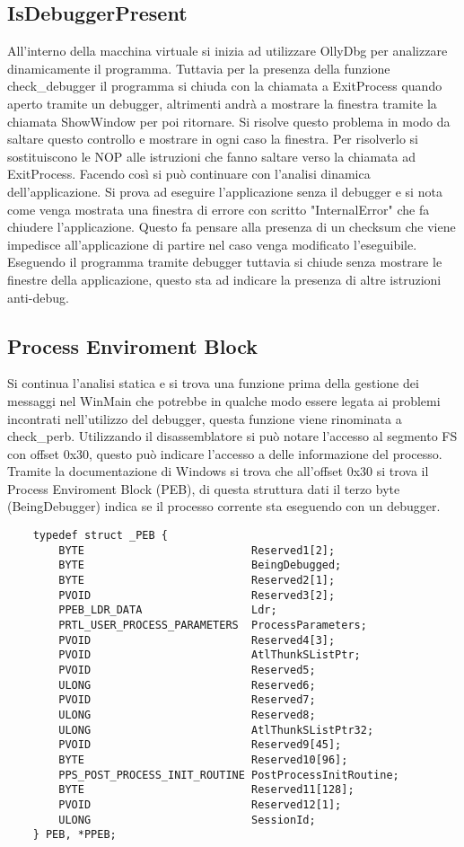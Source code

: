 \documentclass[a4paper,10pt]{article}
\begin{document}
\subsection{IsDebuggerPresent}
All'interno della macchina virtuale si inizia ad utilizzare OllyDbg per analizzare dinamicamente il programma. Tuttavia per la presenza della funzione check\_debugger il programma si chiuda con la chiamata a ExitProcess quando aperto tramite un debugger, altrimenti andrà a mostrare la finestra tramite la chiamata ShowWindow per poi ritornare. Si risolve questo problema in modo da saltare questo controllo e mostrare in ogni caso la finestra. Per risolverlo si sostituiscono le NOP alle istruzioni che fanno saltare verso la chiamata ad ExitProcess.
 Facendo così si può continuare con l'analisi dinamica dell'applicazione. Si prova ad eseguire l'applicazione senza il debugger e si nota come venga mostrata una finestra di errore con scritto "InternalError" che fa chiudere l'applicazione. Questo fa pensare alla presenza di un checksum che viene impedisce all'applicazione di partire nel caso venga modificato l'eseguibile.  Eseguendo il programma tramite debugger tuttavia si chiude senza mostrare le finestre della applicazione, questo sta ad indicare la presenza di altre istruzioni anti-debug. 

\subsection{Process Enviroment Block}
Si continua l'analisi statica e si trova una funzione prima della gestione dei messaggi nel WinMain che potrebbe in qualche modo essere legata ai problemi incontrati nell'utilizzo del debugger, questa funzione viene rinominata a check\_perb. Utilizzando il disassemblatore si può notare l'accesso al segmento FS con offset 0x30, questo può indicare l'accesso a delle informazione del processo. Tramite la documentazione di Windows si trova che all'offset 0x30 si trova il Process Enviroment Block (PEB), di questa struttura dati il terzo byte (BeingDebugger) indica se il processo corrente sta eseguendo con un debugger.

\begin{verbatim}
	typedef struct _PEB {
		BYTE                          Reserved1[2];
		BYTE                          BeingDebugged;
		BYTE                          Reserved2[1];
		PVOID                         Reserved3[2];
		PPEB_LDR_DATA                 Ldr;
		PRTL_USER_PROCESS_PARAMETERS  ProcessParameters;
		PVOID                         Reserved4[3];
		PVOID                         AtlThunkSListPtr;
		PVOID                         Reserved5;
		ULONG                         Reserved6;
		PVOID                         Reserved7;
		ULONG                         Reserved8;
		ULONG                         AtlThunkSListPtr32;
		PVOID                         Reserved9[45];
		BYTE                          Reserved10[96];
		PPS_POST_PROCESS_INIT_ROUTINE PostProcessInitRoutine;
		BYTE                          Reserved11[128];
		PVOID                         Reserved12[1];
		ULONG                         SessionId;
	} PEB, *PPEB;
\end{verbatim}
\end{document}

